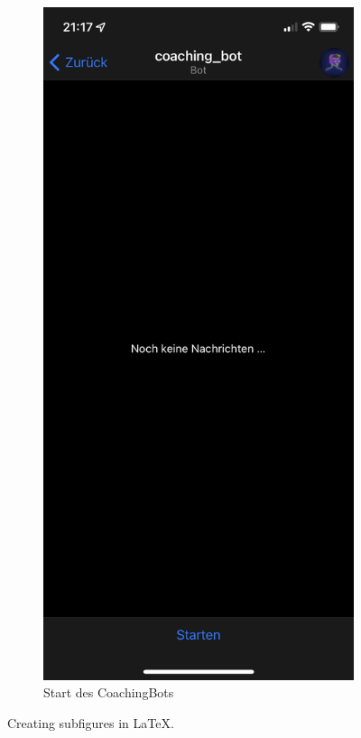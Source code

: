 \begin{figure}
		\begin{subfigure}{0.3\textwidth}
			\includegraphics[width=\textwidth]{images/Screenshots/start.PNG}
			\caption{Start des CoachingBots}
			\label{fig: scs..start}
		\end{subfigure}
		\caption{Creating subfigures in \LaTeX.}
		
		\label{fig:figures}

	\end{figure}
		
